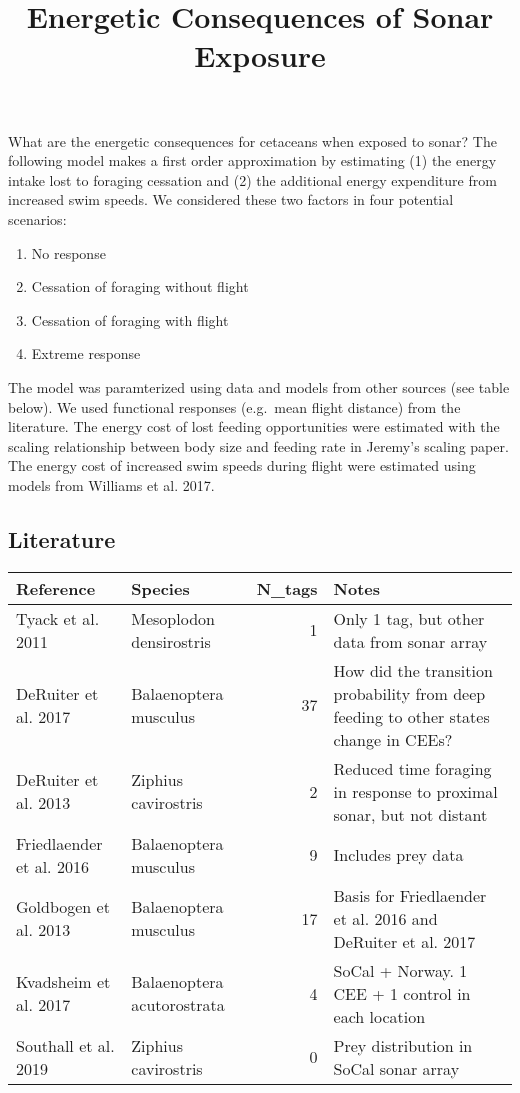 \documentclass[]{article}
\title{Energetic Consequences of Sonar Exposure}
\author{}
\date{}
\providecommand{\tightlist}{%
  \setlength{\itemsep}{0pt}\setlength{\parskip}{0pt}}
\begin{document}
\maketitle

What are the energetic consequences for cetaceans when exposed to sonar?
The following model makes a first order approximation by estimating (1)
the energy intake lost to foraging cessation and (2) the additional
energy expenditure from increased swim speeds. We considered these two
factors in four potential scenarios:

\begin{enumerate}
\def\labelenumi{\arabic{enumi}.}
\tightlist
\item
  No response
\item
  Cessation of foraging without flight
\item
  Cessation of foraging with flight
\item
  Extreme response
\end{enumerate}

The model was paramterized using data and models from other sources (see
table below). We used functional responses (e.g.~mean flight distance)
from the literature. The energy cost of lost feeding opportunities were
estimated with the scaling relationship between body size and feeding
rate in Jeremy's scaling paper. The energy cost of increased swim speeds
during flight were estimated using models from Williams et al. 2017.

\subsection{Literature}\label{literature}

\begin{longtable}[]{@{}llrl@{}}
\toprule
Reference & Species & N\_tags & Notes\tabularnewline
\midrule
\endhead
Tyack et al. 2011 & Mesoplodon densirostris & 1 & Only 1 tag, but other
data from sonar array\tabularnewline
DeRuiter et al. 2017 & Balaenoptera musculus & 37 & How did the
transition probability from deep feeding to other states change in
CEEs?\tabularnewline
DeRuiter et al. 2013 & Ziphius cavirostris & 2 & Reduced time foraging
in response to proximal sonar, but not distant\tabularnewline
Friedlaender et al. 2016 & Balaenoptera musculus & 9 & Includes prey
data\tabularnewline
Goldbogen et al. 2013 & Balaenoptera musculus & 17 & Basis for
Friedlaender et al. 2016 and DeRuiter et al. 2017\tabularnewline
Kvadsheim et al. 2017 & Balaenoptera acutorostrata & 4 & SoCal + Norway.
1 CEE + 1 control in each location\tabularnewline
Southall et al. 2019 & Ziphius cavirostris & 0 & Prey distribution in
SoCal sonar array\tabularnewline
\bottomrule
\end{longtable}
\end{document}
